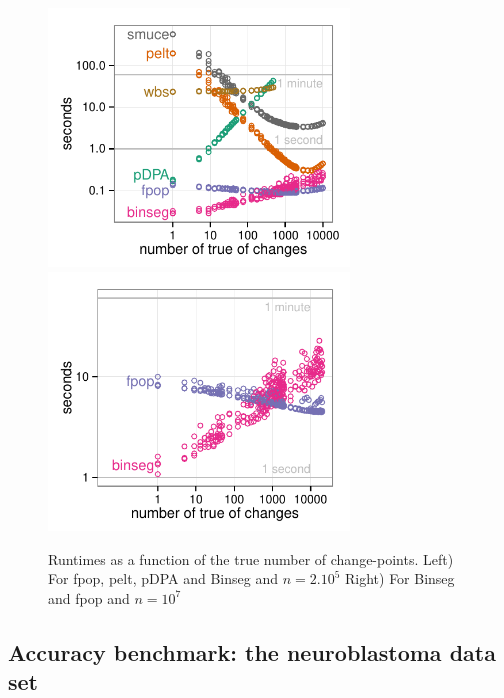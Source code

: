 \documentclass{article}
\begin{document}
\begin{figure}\label{fig:simu_numberK}
  \begin{center}
    \includegraphics[width=8cm]{figure-systemtime-simulation-small}
    \includegraphics[width=8cm]{figure-systemtime-simulationLarge-small}
  \end{center}
\caption{Runtimes as a function of the true number of change-points.
Left) For fpop, pelt,
pDPA and Binseg and $n=2. 10^5$
Right) For Binseg and fpop and $n=10^7$
}
\end{figure}



\subsection{Accuracy benchmark: the neuroblastoma data set}
\end{document}
